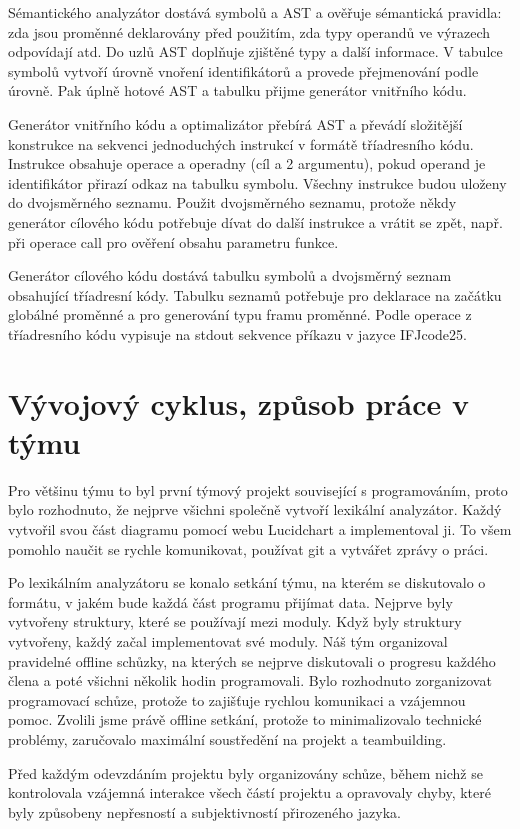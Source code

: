 Sémantického analyzátor dostává symbolů a AST a  ověřuje sémantická pravidla: zda jsou proměnné deklarovány před použitím, zda typy operandů ve výrazech odpovídají atd. Do uzlů AST doplňuje zjištěné typy a další informace. V tabulce symbolů vytvoří úrovně vnoření identifikátorů a provede přejmenování podle úrovně. Pak úplně hotové AST a tabulku přijme generátor vnitřního kódu.

Generátor vnitřního kódu a optimalizátor přebírá AST a převádí složitější konstrukce na sekvenci jednoduchých instrukcí v formátě tříadresního kódu. Instrukce obsahuje operace a operadny (cíl a 2 argumentu), pokud operand je identifikátor přirazí odkaz na tabulku symbolu. Všechny instrukce budou uloženy do dvojsměrného seznamu. Použit dvojsměrného seznamu, protože někdy generátor cílového kódu potřebuje dívat do další instrukce a vrátit se zpět, např. při operace call pro ověření obsahu parametru funkce. 

Generátor cílového kódu dostává tabulku symbolů a dvojsměrný seznam obsahující tříadresní kódy. Tabulku seznamů potřebuje pro deklarace na začátku globálné proměnné a pro generování typu framu proměnné. Podle operace z tříadresního kódu vypisuje na stdout sekvence příkazu v jazyce IFJcode25.

\section{Vývojový cyklus, způsob práce v týmu}
Pro většinu týmu to byl první týmový projekt související s programováním, proto bylo rozhodnuto, že nejprve všichni společně vytvoří lexikální analyzátor. Každý vytvořil svou část diagramu pomocí webu Lucidchart a implementoval ji. To všem pomohlo naučit se rychle komunikovat, používat git a vytvářet zprávy o práci.

Po lexikálním analyzátoru se konalo setkání týmu, na kterém se diskutovalo o formátu, v jakém bude každá část programu přijímat data. Nejprve byly vytvořeny struktury, které se používají mezi moduly. Když byly struktury vytvořeny, každý začal implementovat své moduly. Náš tým organizoval pravidelné offline schůzky, na kterých se nejprve diskutovali o progresu každého člena a poté všichni několik hodin programovali. Bylo rozhodnuto zorganizovat programovací schůze, protože to zajišťuje rychlou komunikaci a vzájemnou pomoc. Zvolili jsme právě offline setkání, protože to minimalizovalo technické problémy, zaručovalo maximální soustředění na projekt a teambuilding.

Před každým odevzdáním projektu byly organizovány schůze, během nichž se kontrolovala vzájemná interakce všech částí projektu a opravovaly chyby, které byly způsobeny nepřesností a subjektivností přirozeného jazyka.
